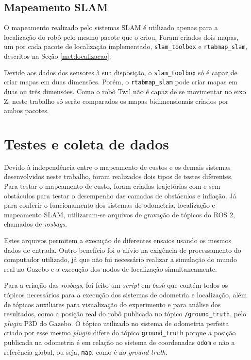 \documentclass[repeatfields,xlists,xpacks,oneside,yearsonly]{ufrgscca}
\begin{document}
\subsection{Mapeamento SLAM}

O mapeamento realizado pelo sistemas SLAM é utilizado apenas para a
localização do robô pelo mesmo pacote que o criou. Foram criados dois
mapas, um por cada pacote de localização implementado,
\texttt{slam\_toolbox} e \texttt{rtabmap\_slam}, descritos na Seção
\ref{met:localizacao}.

Devido aos dados dos sensores à sua disposição, o
\texttt{slam\_toolbox} só é capaz de criar mapas em duas dimensões.
Porém, o \texttt{rtabmap\_slam} pode criar mapas em duas ou três
dimensões. Como o robô Twil não é capaz de se movimentar no eixo Z,
neste trabalho só serão comparados os mapas bidimensionais criados
por ambos pacotes.

\section{Testes e coleta de dados}
\label{met:testes}

Devido à independência entre o mapeamento de custos e os demais
sistemas desenvolvidos neste trabalho, foram realizados dois tipos de
testes diferentes. Para testar o mapeamento de custo, foram criadas
trajetórias com e sem obstáculos para testar o desempenho das camadas
de obstáculos e inflação. Já para conferir o funcionamento dos
sistemas de odometria, localização e mapeamento SLAM, utilizaram-se
arquivos de gravação de tópicos do ROS 2, chamados de
\textit{rosbags}.

Estes arquivos permitem a execução de diferentes ensaios usando os
mesmos dados de entrada. Outro benefício foi o alívio na exigência de
processamento do computador utilizado, já que não foi necessário
realizar a simulação do mundo real no Gazebo e a execução dos nodos
de localização simultaneamente.

Para a criação das \textit{rosbags}, foi feito um \textit{script} em
\textit{bash} que contém todos os tópicos necessários para a execução
dos sistemas de odometria e localização, além de tópicos auxiliares
para visualização do experimento e para análise dos resultados, como
a posição real do robô publicada no tópico \texttt{/ground\_truth},
pelo \textit{plugin} P3D do Gazebo. O tópico utilizado no sistema de
odometria perfeita criado por esse mesmo \textit{plugin} difere do
tópico \texttt{ground\_truth} porque a posição publicada na odometria
é em relação ao sistema de coordenadas \texttt{odom} e não a
referência global, ou seja, \texttt{map}, como é no \textit{ground
    truth}.
\end{document}
